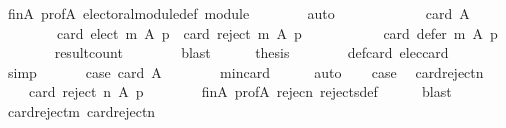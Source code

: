 \begin{isabellebody}
\ fin{\isacharunderscore}{\kern0pt}A\ prof{\isacharunderscore}{\kern0pt}A\ electoral{\isacharunderscore}{\kern0pt}module{\isacharunderscore}{\kern0pt}def\ module\isanewline
\ \ \ \ \ \ \isamarkupfalse%
\ auto\isanewline
\ \ \ \ \isamarkupfalse%
\ \isamarkupfalse%
\isanewline
\ \ \ \ \ \ {\isachardoublequoteopen}card\ A\ {\isacharequal}{\kern0pt}\isanewline
\ \ \ \ \ \ \ \ card\ {\isacharparenleft}{\kern0pt}elect\ m\ A\ p{\isacharparenright}{\kern0pt}\ {\isacharplus}{\kern0pt}\ card\ {\isacharparenleft}{\kern0pt}reject\ m\ A\ p{\isacharparenright}{\kern0pt}\ {\isacharplus}{\kern0pt}\isanewline
\ \ \ \ \ \ \ \ \ \ card\ {\isacharparenleft}{\kern0pt}defer\ m\ A\ p{\isacharparenright}{\kern0pt}{\isachardoublequoteclose}\isanewline
\ \ \ \ \ \ \isamarkupfalse%
\ result{\isacharunderscore}{\kern0pt}count\isanewline
\ \ \ \ \ \ \isamarkupfalse%
\ blast\isanewline
\ \ \ \ \isamarkupfalse%
\ {\isacharquery}{\kern0pt}thesis\isanewline
\ \ \ \ \ \ \isamarkupfalse%
\ def{\isacharunderscore}{\kern0pt}card{\isacharunderscore}{\kern0pt}{}\ elec{\isacharunderscore}{\kern0pt}card{\isacharunderscore}{\kern0pt}{}\isanewline
\ \ \ \ \ \ \isamarkupfalse%
\ simp\isanewline
\ \ \isamarkupfalse%
\isanewline
\ \ \isamarkupfalse%
\ case{}{\isacharcolon}{\kern0pt}\ {\isachardoublequoteopen}card\ A\ {\isasymge}\ {}{\isachardoublequoteclose}\isanewline
\ \ \ \ \isamarkupfalse%
\ min{\isacharunderscore}{\kern0pt}{}{\isacharunderscore}{\kern0pt}card\isanewline
\ \ \ \ \isamarkupfalse%
\ auto\isanewline
\ \ \isamarkupfalse%
\ case{}\ \isamarkupfalse%
\ card{\isacharunderscore}{\kern0pt}reject{\isacharunderscore}{\kern0pt}n{\isacharcolon}{\kern0pt}\isanewline
\ \ \ \ {\isachardoublequoteopen}card\ {\isacharparenleft}{\kern0pt}reject\ n\ A\ p{\isacharparenright}{\kern0pt}\ {\isacharequal}{\kern0pt}\ {}{\isachardoublequoteclose}\isanewline
\ \ \ \ \isamarkupfalse%
\ fin{\isacharunderscore}{\kern0pt}A\ prof{\isacharunderscore}{\kern0pt}A\ rejec{\isacharunderscore}{\kern0pt}n{\isacharunderscore}{\kern0pt}{}\ rejects{\isacharunderscore}{\kern0pt}def\isanewline
\ \ \ \ \isamarkupfalse%
\ blast\isanewline
\ \ \isamarkupfalse%
\ card{\isacharunderscore}{\kern0pt}reject{\isacharunderscore}{\kern0pt}m\ card{\isacharunderscore}{\kern0pt}reject{\isacharunderscore}{\kern0pt}n\isanewline

\end{isabellebody}
